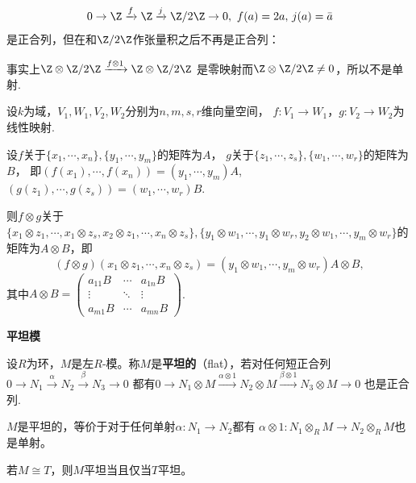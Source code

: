 \begin{example}
    $$0\rightarrow \Z \xrightarrow{f} \Z \xrightarrow{j} \Z/2\Z \rightarrow 0,
    \ f(a)=2a,\,j(a)=\bar{a}$$是正合列，但在和$\Z/2\Z$作张量积之后不再是正合列：

    事实上$\Z\otimes\Z/2\Z\xrightarrow{f\otimes1}\Z\otimes\Z/2\Z$
    是零映射而$\Z\otimes\Z/2\Z\neq0$，所以不是单射.
\end{example}

\begin{proposition}
    设$k$为域，$V_1,W_1,V_2,W_2$分别为$n,m,s,r$维向量空间，
    $f:V_1\rightarrow W_1$，$g:V_2\rightarrow W_2$为线性映射.\par
    \qquad 设$f$关于$\{x_1,\cdots,x_n\},\{y_1,\cdots,y_m\}$的矩阵为$A$，
    $g$关于$\{z_1,\cdots,z_s\},\{w_1,\cdots,w_r\}$的矩阵为$B$，
    即$(f(x_1),\cdots, f(x_n))=(y_1,\cdots,y_m)A$, 
    $(g(z_1),\cdots,g(z_s))=(w_1,\cdots,w_r)B$.\par
    \qquad 则$f\otimes g$关于$\{x_1\otimes z_1,\cdots,x_1\otimes z_s, x_2\otimes z_1,\cdots, x_n\otimes z_s\},
    \{y_1\otimes w_1,\cdots,y_1\otimes w_r, y_2\otimes w_1,\cdots,y_m\otimes w_r\}$的矩阵为$A\otimes B$，即
    $$(f\otimes g)(x_1\otimes z_1,\cdots, x_n\otimes z_s)=(y_1\otimes w_1,\cdots,y_m\otimes w_r) A\otimes B,$$
    其中$A\otimes B=\left(\begin{matrix}
        a_{11}B&\cdots&a_{1n}B\\
        \vdots&\ddots&\vdots\\
        a_{m1}B&\cdots&a_{mn}B
    \end{matrix}\right)$.
\end{proposition}

\begin{definition}\textbf{平坦模}\par
    设$R$为环，$M$是左$R$-模。称$M$是\textbf{平坦的}（flat），若对任何短正合列
    $0\rightarrow N_1 \xrightarrow{\alpha} N_2 \xrightarrow{\beta} N_3 \rightarrow 0$
    都有$0\rightarrow N_1\otimes M \xrightarrow{\alpha\otimes1} N_2\otimes M \xrightarrow{\beta\otimes1} N_3\otimes M \rightarrow 0$
    也是正合列.
\end{definition}

\begin{theorem}\label{平坦单}
    $M$是平坦的，等价于对于任何单射$\alpha:N_1\rightarrow N_2$都有
    $\alpha\otimes1:N_1\otimes_R M\rightarrow N_2\otimes_R M$也是单射。
\end{theorem}

\begin{proposition}
    若$M\cong T$，则$M$平坦当且仅当$T$平坦。
\end{proposition}

